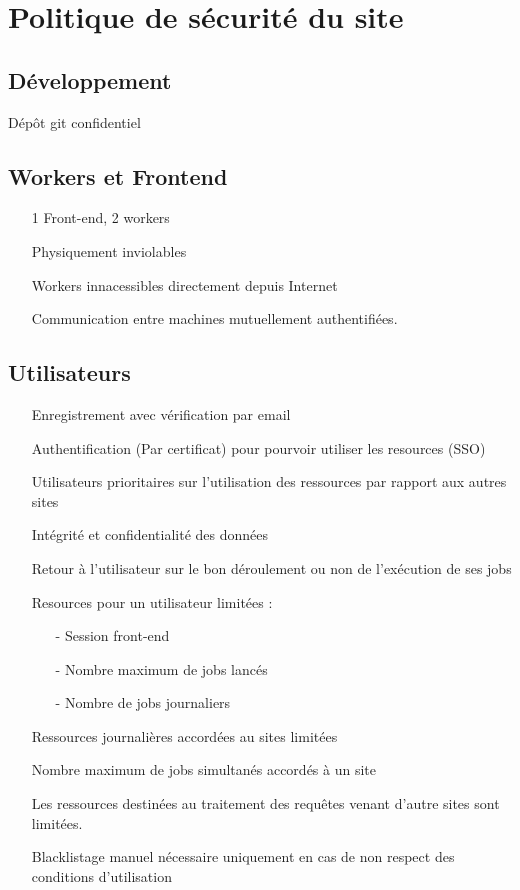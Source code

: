 \newpage

\chapter{Politique de sécurité du site}

\section{Développement}

Dépôt git confidentiel

\section{Workers et Frontend}

\begin{itemize}
\item[\textbullet] 1 Front-end, 2 workers
\item[\textbullet] Physiquement inviolables
\item[\textbullet] Workers innacessibles directement depuis Internet
\item[\textbullet] Communication entre machines mutuellement authentifiées.
\end{itemize}

\section{Utilisateurs}

\begin{itemize}
\item[\textbullet] Enregistrement avec vérification par email
\item[\textbullet] Authentification (Par certificat) pour pourvoir utiliser les resources (SSO)
\item[\textbullet] Utilisateurs prioritaires sur l'utilisation des ressources par rapport aux autres sites
\item[\textbullet] Intégrité et confidentialité des données
\item[\textbullet] Retour à l'utilisateur sur le bon déroulement ou non de l'exécution de ses jobs 
\item[\textbullet] Resources pour un utilisateur limitées :
	\begin{itemize}
		\item[-] Session front-end
		\item[-] Nombre maximum de jobs lancés
		\item[-] Nombre de jobs journaliers
	\end{itemize}
\item[\textbullet] Ressources journalières accordées au sites limitées
\item[\textbullet] Nombre maximum de jobs simultanés accordés à un site
\item[\textbullet] Les ressources destinées au traitement des requêtes venant d'autre sites sont limitées.
\item[\textbullet]  Blacklistage manuel nécessaire uniquement en cas de non respect des conditions d'utilisation
\end{itemize}
 
